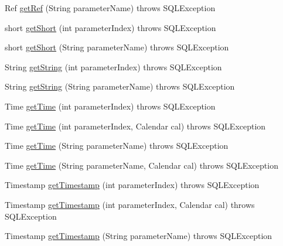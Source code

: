 \begin{DoxyCompactItemize}
\item 
Ref \mbox{\hyperlink{classcom_1_1mysql_1_1cj_1_1jdbc_1_1_callable_statement_af7a8d26f34cc8e3de6ef0f752a120522}{get\+Ref}} (String parameter\+Name)  throws S\+Q\+L\+Exception 
\item 
short \mbox{\hyperlink{classcom_1_1mysql_1_1cj_1_1jdbc_1_1_callable_statement_a76c1fd1939e74de3c13d31f2be917be5}{get\+Short}} (int parameter\+Index)  throws S\+Q\+L\+Exception 
\item 
short \mbox{\hyperlink{classcom_1_1mysql_1_1cj_1_1jdbc_1_1_callable_statement_a27a1597b2ad871acb0687bd2c5a5ab2e}{get\+Short}} (String parameter\+Name)  throws S\+Q\+L\+Exception 
\item 
String \mbox{\hyperlink{classcom_1_1mysql_1_1cj_1_1jdbc_1_1_callable_statement_a003eb4a2772e2ed3d56e94c6a5329c90}{get\+String}} (int parameter\+Index)  throws S\+Q\+L\+Exception 
\item 
String \mbox{\hyperlink{classcom_1_1mysql_1_1cj_1_1jdbc_1_1_callable_statement_ab7834c33851bc5ef89b347980188d89e}{get\+String}} (String parameter\+Name)  throws S\+Q\+L\+Exception 
\item 
Time \mbox{\hyperlink{classcom_1_1mysql_1_1cj_1_1jdbc_1_1_callable_statement_a3cccf3351176e00eaa0d0fc817912868}{get\+Time}} (int parameter\+Index)  throws S\+Q\+L\+Exception 
\item 
Time \mbox{\hyperlink{classcom_1_1mysql_1_1cj_1_1jdbc_1_1_callable_statement_aefec73ec4f73a6f345d8068f40b370aa}{get\+Time}} (int parameter\+Index, Calendar cal)  throws S\+Q\+L\+Exception 
\item 
Time \mbox{\hyperlink{classcom_1_1mysql_1_1cj_1_1jdbc_1_1_callable_statement_a159ebf9a2c557e3b3be590039e235706}{get\+Time}} (String parameter\+Name)  throws S\+Q\+L\+Exception 
\item 
Time \mbox{\hyperlink{classcom_1_1mysql_1_1cj_1_1jdbc_1_1_callable_statement_abf92189287e2a654e1c59e348cb11928}{get\+Time}} (String parameter\+Name, Calendar cal)  throws S\+Q\+L\+Exception 
\item 
Timestamp \mbox{\hyperlink{classcom_1_1mysql_1_1cj_1_1jdbc_1_1_callable_statement_a106f01266c7bfbaa1c14e3a5a3be0d2b}{get\+Timestamp}} (int parameter\+Index)  throws S\+Q\+L\+Exception 
\item 
Timestamp \mbox{\hyperlink{classcom_1_1mysql_1_1cj_1_1jdbc_1_1_callable_statement_a95a1e742a567a1dfe798b172770acfe3}{get\+Timestamp}} (int parameter\+Index, Calendar cal)  throws S\+Q\+L\+Exception 
\item 
Timestamp \mbox{\hyperlink{classcom_1_1mysql_1_1cj_1_1jdbc_1_1_callable_statement_ad259b38c5fa0c1d844e7a2a2d78c420f}{get\+Timestamp}} (String parameter\+Name)  throws S\+Q\+L\+Exception 

\end{DoxyCompactItemize}
